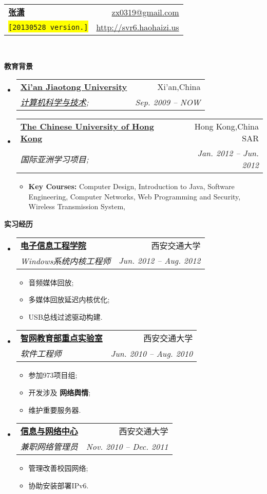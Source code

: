 \documentclass[letterpaper,11pt]{article}
\makeatletter
\newcommand{\resitem}[1]{\item #1 \vspace{-2pt}}
\newcommand{\resheading}[1]{{\large \colorbox{mygrey}{\begin{minipage}{\textwidth}{\textbf{#1 \vphantom{p\^{E}}}}\end{minipage}}}}
\newcommand{\ressubheading}[4]{
\begin{tabular*}{6.5in}{l@{\extracolsep{\fill}}r}
		\textbf{#1} & #2 \\
		\textit{#3} & \textit{#4} \\
\end{tabular*}\vspace{-6pt}}
\makeatother
\begin{document}
\begin{CJK}{UTF8}{gbsn}

\newcommand{\mywebheader}{
\begin{tabular*}{7in}{l@{\extracolsep{\fill}}r}
	\textbf{\href{http://svr6.haohaizi.us/}{\LARGE 张潇}} & \href{mailto:zx0319@gmail.com}{zx0319@gmail.com}\\
	{\footnotesize \texttt{\colorbox{yellow}{[20130528 version.]}}} & \href{http://svr6.haohaizi.us}{http://svr6.haohaizi.us} \\
	\end{tabular*}
\\
\vspace{0.1in}}

\mywebheader

\resheading{教育背景}
	\begin{itemize}
		\item
			\ressubheading{\href{http://www.xjtu.edu.cn}{Xi'an Jiaotong University}}{Xi'an,China}{\href{http://www.cs.xjtu.edu.cn}{计算机科学与技术};}{Sep. 2009 -- NOW}
			
		\item
			\ressubheading{\href{http://www.cuhk.edu.hk}{The Chinese University of Hong Kong}}{Hong Kong,China SAR}{{国际亚洲学习项目};}{Jan. 2012 -- Jun. 2012}
				{ \footnotesize
				\begin{itemize}
					\resitem
					{\textbf{Key Courses:}
						{Computer Design},
						{Introduction to Java},
						{Software Engineering},
						{Computer Networks},
						{Web Programming and Security},
						{Wireless Transmission System},
					}
				\end{itemize}
			}
	\end{itemize} %

\resheading{实习经历}
	\begin{itemize}
		\item 
			\ressubheading{\href{http://eie.xjtu.edu.cn/}{电子信息工程学院}}{西安交通大学}{Windows系统内核工程师}{Jun. 2012 -- Aug. 2012}
				{ \footnotesize
				\begin{itemize}
					\resitem{音频媒体回放;}
					\resitem{多媒体回放延迟内核优化;}
					\resitem{USB总线过滤驱动构建.}
				\end{itemize}
				}
		\item 
			\ressubheading{\href{http://nskeylab.xjtu.edu.cn/}{智网教育部重点实验室}}{西安交通大学}{软件工程师}{Jun. 2010 -- Aug. 2010}
				{ \footnotesize
				\begin{itemize}
					\resitem{参加973项目组;}
					\resitem{开发涉及 \textbf{网络舆情};}
					\resitem{维护重要服务器.}
				\end{itemize}
				}
		\item
			\ressubheading{\href{http://nic.xjtu.edu.cn}{信息与网络中心}}{西安交通大学}{兼职网络管理员}{Nov. 2010 -- Dec. 2011}
				{ \footnotesize
				\begin{itemize}
					\resitem{管理改善校园网络;}
					\resitem{协助安装部署IPv6.}
				\end{itemize}
          		}
	\end{itemize}
	

\end{CJK}
\end{document}
